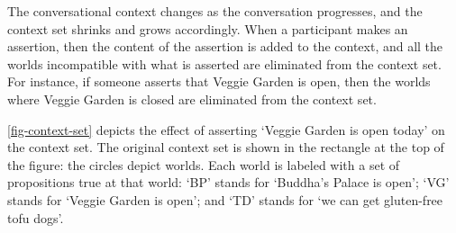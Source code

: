 The conversational context changes as the conversation progresses, and the context set shrinks and grows accordingly.  When a participant makes an assertion, then the content of the assertion is added to the context, and all the worlds incompatible with what is asserted are eliminated from the context set.  For instance, if someone asserts that Veggie Garden is open, then the worlds where Veggie Garden is closed are eliminated from the context set.

\autoref{fig-context-set} depicts the effect of asserting `Veggie Garden is open today' on the context set.  The original context set is shown in the rectangle at the top of the figure: the circles depict worlds.  Each world is labeled with a set of propositions true at that world: `BP' stands for `Buddha's Palace is open'; `VG' stands for `Veggie Garden is open'; and `TD' stands for `we can get gluten-free tofu dogs'.

